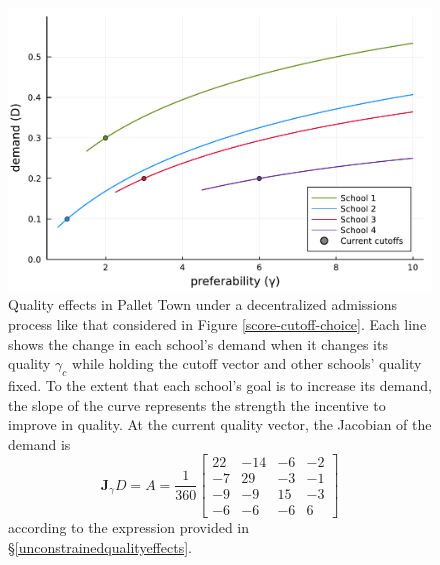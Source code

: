 \documentclass[12pt]{article}
\numberwithin{equation}{subsection}
\theoremstyle{definition}
\begin{document}
\begin{figure}
\begin{center}\includegraphics[width=\linewidth, ]{plots/vary-gamma-demand.pdf}\end{center}
\captionsetup{singlelinecheck=off}
    \caption[.]{Quality effects in Pallet Town under a decentralized admissions process like that considered in Figure \ref{score-cutoff-choice}. Each line shows the change in each school’s demand when it changes its quality $\gamma_c$ while holding the cutoff vector and other schools’ quality fixed. To the extent that each school's goal is to increase its demand, the slope of the curve represents the strength the incentive to improve in quality. At the current quality vector, the Jacobian of the demand is
    \begin{equation*}
    \mathbf{J}_\gamma D = A = \frac{1}{360}
    \begin{bmatrix}
22 & -14 & -6&  -2\\
 -7   &29  &-3  &-1\\
 -9   &-9  &15  &-3\\
 -6   &-6&  -6  & 6
    \end{bmatrix}
    \end{equation*} 
    according to the expression provided in \S\ref{unconstrainedqualityeffects}. }
\label{vary-gamma-demand}
\end{figure}
\end{document}
